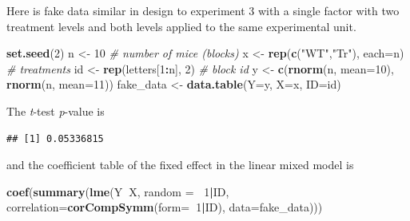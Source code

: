 \documentclass[]{book}
\newenvironment{Shaded}{\begin{snugshade}}{\end{snugshade}}
\newcommand{\CommentTok}[1]{\textcolor[rgb]{0.56,0.35,0.01}{\textit{#1}}}
\newcommand{\DataTypeTok}[1]{\textcolor[rgb]{0.13,0.29,0.53}{#1}}
\newcommand{\DecValTok}[1]{\textcolor[rgb]{0.00,0.00,0.81}{#1}}
\newcommand{\KeywordTok}[1]{\textcolor[rgb]{0.13,0.29,0.53}{\textbf{#1}}}
\newcommand{\NormalTok}[1]{#1}
\newcommand{\OperatorTok}[1]{\textcolor[rgb]{0.81,0.36,0.00}{\textbf{#1}}}
\newcommand{\OtherTok}[1]{\textcolor[rgb]{0.56,0.35,0.01}{#1}}
\newcommand{\StringTok}[1]{\textcolor[rgb]{0.31,0.60,0.02}{#1}}
\begin{document}
Here is fake data similar in design to experiment 3 with a single factor with two treatment levels and both levels applied to the same experimental unit.

\begin{Shaded}
\begin{Highlighting}[]
\KeywordTok{set.seed}\NormalTok{(}\DecValTok{2}\NormalTok{)}
\NormalTok{n <-}\StringTok{ }\DecValTok{10} \CommentTok{# number of mice (blocks)}
\NormalTok{x <-}\StringTok{ }\KeywordTok{rep}\NormalTok{(}\KeywordTok{c}\NormalTok{(}\StringTok{"WT"}\NormalTok{,}\StringTok{"Tr"}\NormalTok{), }\DataTypeTok{each=}\NormalTok{n) }\CommentTok{# treatments}
\NormalTok{id <-}\StringTok{ }\KeywordTok{rep}\NormalTok{(letters[}\DecValTok{1}\OperatorTok{:}\NormalTok{n], }\DecValTok{2}\NormalTok{) }\CommentTok{# block id}
\NormalTok{y <-}\StringTok{ }\KeywordTok{c}\NormalTok{(}\KeywordTok{rnorm}\NormalTok{(n, }\DataTypeTok{mean=}\DecValTok{10}\NormalTok{), }\KeywordTok{rnorm}\NormalTok{(n, }\DataTypeTok{mean=}\DecValTok{11}\NormalTok{))}
\NormalTok{fake_data <-}\StringTok{ }\KeywordTok{data.table}\NormalTok{(}\DataTypeTok{Y=}\NormalTok{y, }\DataTypeTok{X=}\NormalTok{x, }\DataTypeTok{ID=}\NormalTok{id)}
\end{Highlighting}
\end{Shaded}

The \emph{t}-test \emph{p}-value is

\begin{Shaded}
\end{Shaded}

\begin{verbatim}
## [1] 0.05336815
\end{verbatim}

and the coefficient table of the fixed effect in the linear mixed model is

\begin{Shaded}
\begin{Highlighting}[]
\KeywordTok{coef}\NormalTok{(}\KeywordTok{summary}\NormalTok{(}\KeywordTok{lme}\NormalTok{(Y}\OperatorTok{~}\NormalTok{X, }\DataTypeTok{random =} \OperatorTok{~}\DecValTok{1}\OperatorTok{|}\NormalTok{ID, }\DataTypeTok{correlation=}\KeywordTok{corCompSymm}\NormalTok{(}\DataTypeTok{form=}\OperatorTok{~}\DecValTok{1}\OperatorTok{|}\NormalTok{ID), }\DataTypeTok{data=}\NormalTok{fake_data)))}
\end{Highlighting}
\end{Shaded}
\end{document}

